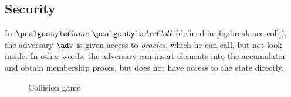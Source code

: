 \subsection{Security}

In $\Game~\algo{AccColl}$ (defined in \autoref{fig:break-acc-coll}), the adversary $\adv$ is given access to \emph{oracles}, which he can call, but not look inside.
In other words, the adversary can insert elements into the accumulator and obtain membership proofs, but does not have access to the state directly.

\begin{figure}[tbhp]
  \begin{center}
    \begin{tcolorbox}[width=13cm]
      \begin{pcvstack}[center]
        \pcvspace
        \begin{pchstack}[center]
        \pchspace
        \end{pchstack}
      \end{pcvstack}
    \end{tcolorbox}
  \end{center}
  \caption{Collision game \label{fig:break-acc-coll}}
\end{figure}

